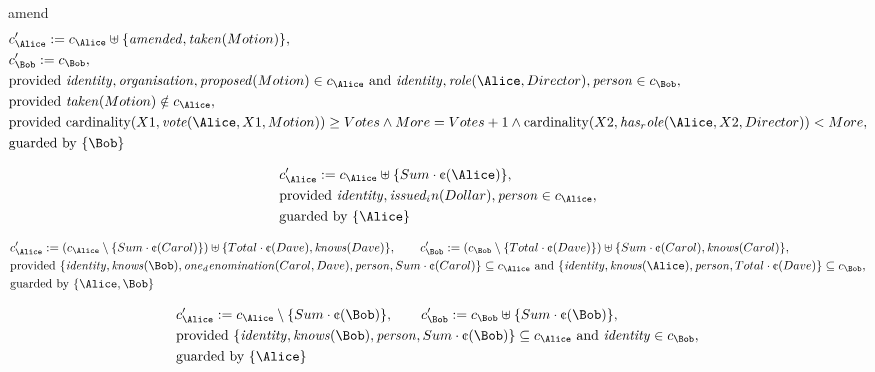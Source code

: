 amend
\fi
\begin{align*}
&
c'_
{
\Alice
}
 := 
c_
{
\Alice
}
 \uplus 
\{
\mathit{
amended
}
,
\mathit{
taken
}
(
Motion
)
\}
,\\
&
c'_
{
\Bob
}
 := 
c_
{
\Bob
}
,\\
&
\text{provided } 
\mathit{
identity
}
,
\mathit{
organisation
}
,
\mathit{
proposed
}
(
Motion
)
 \in c_
{
\Alice
}
 \text{ and } 
\mathit{
identity
}
,
\mathit{
role
}
(
\Alice
,
Director
)
,
\mathit{
person
}
 \in c_
{
\Bob
}
,\\
&
\text{provided } 
\mathit{
taken
}
(
Motion
)
 \notin c_
{
\Alice
}
,\\
&
\text{provided } 
\mathrm{cardinality}(
X1
,
\mathit{
vote
}
(
\Alice
,
X1
,
Motion
)
)
\ge
Votes
\land
More
=
Votes
+
1
\land
\mathrm{cardinality}(
X2
,
\mathit{
has_role
}
(
\Alice
,
X2
,
Director
)
)
<
More
,\\
&
\text{guarded by } \{
\Bob
\}
\end{align*}

\begin{align*}
&
c'_
{
\Alice
}
 := 
c_
{
\Alice
}
 \uplus 
\{
Sum
\cdot
\text{\textcent}
(
\Alice
)
\}
,\\
&
\text{provided } 
\mathit{
identity
}
,
\mathit{
issued_in
}
(
Dollar
)
,
\mathit{
person
}
 \in c_
{
\Alice
}
,\\
&
\text{guarded by } \{
\Alice
\}
\end{align*}

\begin{align*}
&
c'_
{
\Alice
}
 := 
(c_
{
\Alice
}
 \setminus 
\{
Sum
\cdot
\text{\textcent}
(
Carol
)
\}
) \uplus 
\{
Total
\cdot
\text{\textcent}
(
Dave
)
,
\mathit{
knows
}
(
Dave
)
\}
, \qquad 
c'_
{
\Bob
}
 := 
(c_
{
\Bob
}
 \setminus 
\{
Total
\cdot
\text{\textcent}
(
Dave
)
\}
) \uplus 
\{
Sum
\cdot
\text{\textcent}
(
Carol
)
,
\mathit{
knows
}
(
Carol
)
\}
,\\
&
\text{provided } 
\{
\mathit{
identity
}
,
\mathit{
knows
}
(
\Bob
)
,
\mathit{
one_denomination
}
(
Carol
,
Dave
)
,
\mathit{
person
}
,
Sum
\cdot
\text{\textcent}
(
Carol
)
\}
 \subseteq c_
{
\Alice
}
 \text{ and } 
\{
\mathit{
identity
}
,
\mathit{
knows
}
(
\Alice
)
,
\mathit{
person
}
,
Total
\cdot
\text{\textcent}
(
Dave
)
\}
 \subseteq c_
{
\Bob
}
,\\
&
\text{guarded by } \{
\Alice
,
\Bob
\}
\end{align*}

\begin{align*}
&
c'_
{
\Alice
}
 := 
c_
{
\Alice
}
 \setminus 
\{
Sum
\cdot
\text{\textcent}
(
\Bob
)
\}
, \qquad 
c'_
{
\Bob
}
 := 
c_
{
\Bob
}
 \uplus 
\{
Sum
\cdot
\text{\textcent}
(
\Bob
)
\}
,\\
&
\text{provided } 
\{
\mathit{
identity
}
,
\mathit{
knows
}
(
\Bob
)
,
\mathit{
person
}
,
Sum
\cdot
\text{\textcent}
(
\Bob
)
\}
 \subseteq c_
{
\Alice
}
 \text{ and } 
\mathit{
identity
}
 \in c_
{
\Bob
}
,\\
&
\text{guarded by } \{
\Alice
\}
\end{align*}

